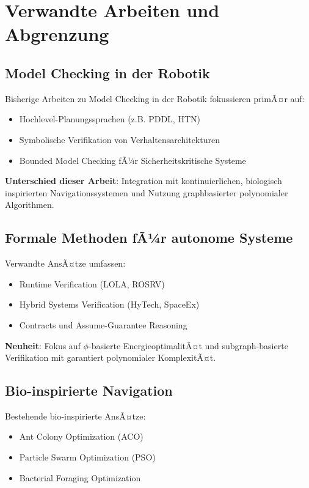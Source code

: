 ﻿\documentclass[a4paper,12pt]{article}
\theoremstyle{definition}
\begin{document}
\section{Verwandte Arbeiten und Abgrenzung}

\subsection{Model Checking in der Robotik}

Bisherige Arbeiten zu Model Checking in der Robotik fokussieren primÃ¤r auf:
\begin{itemize}
	\item Hochlevel-Planungssprachen (z.B. PDDL, HTN)
	\item Symbolische Verifikation von Verhaltensarchitekturen
	\item Bounded Model Checking fÃ¼r Sicherheitskritische Systeme
\end{itemize}

\textbf{Unterschied dieser Arbeit}: Integration mit kontinuierlichen, biologisch inspirierten Navigationssystemen und Nutzung graphbasierter polynomialer Algorithmen.

\subsection{Formale Methoden fÃ¼r autonome Systeme}

Verwandte AnsÃ¤tze umfassen:
\begin{itemize}
	\item Runtime Verification (LOLA, ROSRV)
	\item Hybrid Systems Verification (HyTech, SpaceEx)
	\item Contracts und Assume-Guarantee Reasoning
\end{itemize}

\textbf{Neuheit}: Fokus auf $\phi$-basierte EnergieoptimalitÃ¤t und subgraph-basierte Verifikation mit garantiert polynomialer KomplexitÃ¤t.

\subsection{Bio-inspirierte Navigation}

Bestehende bio-inspirierte AnsÃ¤tze:
\begin{itemize}
	\item Ant Colony Optimization (ACO)
	\item Particle Swarm Optimization (PSO)
	\item Bacterial Foraging Optimization
\end{itemize}
\end{document}
